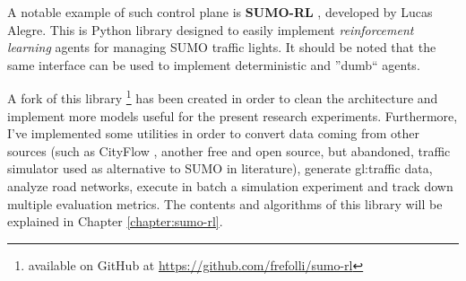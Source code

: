 A notable example of such control plane is \textbf{SUMO-RL} \cite{sumorl}, developed by Lucas Alegre. This is Python library designed to easily implement \textit{reinforcement learning} agents for managing SUMO traffic lights. It should be noted that the same interface can be used to implement deterministic and ''dumb`` agents.

A fork of this library \footnote{available on GitHub at \href{https://github.com/frefolli/sumo-rl}{https://github.com/frefolli/sumo-rl}} has been created in order to clean the architecture and implement more models useful for the present research experiments. Furthermore, I've implemented some utilities in order to convert data coming from other sources (such as CityFlow \cite{10.1145/3308558.3314139}, another free and open source, but abandoned, traffic simulator used as alternative to SUMO in literature), generate \gls{gl:traffic} data, analyze road networks, execute in batch a simulation experiment and track down multiple evaluation metrics. The contents and algorithms of this library will be explained in Chapter \ref{chapter:sumo-rl}.
